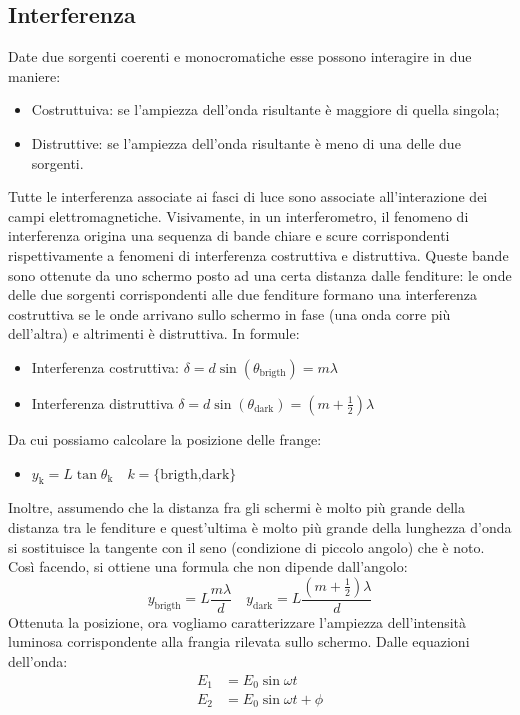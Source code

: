 \documentclass{article}
\begin{document}
\subsection{Interferenza}
Date due sorgenti coerenti e monocromatiche esse possono interagire in due maniere:\begin{itemize}
    \item Costruttuiva: se l'ampiezza dell'onda risultante è maggiore di quella singola;
    \item Distruttive: se l'ampiezza dell'onda risultante è meno di una delle due sorgenti.
\end{itemize}
Tutte le interferenza associate ai fasci di luce sono associate all'interazione dei campi elettromagnetiche. Visivamente, in un interferometro, il fenomeno di interferenza origina una sequenza di bande chiare e scure corrispondenti rispettivamente a fenomeni di interferenza costruttiva e distruttiva. Queste bande sono ottenute da uno schermo posto ad una certa distanza dalle fenditure: le onde delle due sorgenti corrispondenti alle due fenditure formano una interferenza costruttiva se le onde arrivano sullo schermo in fase (una onda corre più dell'altra) e altrimenti è distruttiva.
In formule:\begin{itemize}
    \item Interferenza costruttiva: \(\delta= d\sin{(\theta_{\text{brigth}})}=m\lambda \)
    \item Interferenza distruttiva  \(\delta= d\sin{(\theta_{\text{dark}})}=(m+\frac{1}{2})\lambda \)
\end{itemize}
Da cui possiamo calcolare la posizione delle frange:\begin{itemize}
    \item \(y_{\text{k}}=L\tan{\theta_{\text{k}}}\quad k =\{\text{brigth,dark}\} \)
\end{itemize}
Inoltre, assumendo che la distanza fra gli schermi è molto più grande della distanza tra le fenditure e quest'ultima è molto più grande della lunghezza d'onda si sostituisce la tangente con il seno (condizione di piccolo angolo) che è noto. Così facendo, si ottiene una formula che non dipende dall'angolo:\begin{equation}
    y_{\text{brigth}}= L\frac{m\lambda}{d}\quad  y_{\text{dark}}= L\frac{(m+\frac{1}{2})\lambda}{d}
\end{equation}
Ottenuta la posizione, ora vogliamo caratterizzare l'ampiezza dell'intensità luminosa corrispondente alla frangia rilevata sullo schermo. Dalle equazioni dell'onda:\begin{align}
    E_{1}&=E_{0}\sin{\omega t}\\
    E_{2}&=E_{0}\sin{\omega t+\phi}
\end{align}
\end{document}
